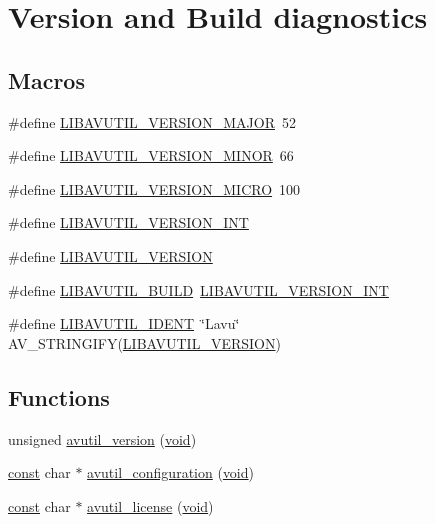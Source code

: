 \hypertarget{group__lavu__ver}{}\section{Version and Build diagnostics}
\label{group__lavu__ver}
\subsection*{Macros}
\begin{DoxyCompactItemize}
\item 
\#define \hyperlink{group__lavu__ver_gaa29a3ad3376b8050d9ef4779045f745e}{L\+I\+B\+A\+V\+U\+T\+I\+L\+\_\+\+V\+E\+R\+S\+I\+O\+N\+\_\+\+M\+A\+J\+OR}~52
\item 
\#define \hyperlink{group__lavu__ver_ga9848c90e4ea707cb0732db0de569452a}{L\+I\+B\+A\+V\+U\+T\+I\+L\+\_\+\+V\+E\+R\+S\+I\+O\+N\+\_\+\+M\+I\+N\+OR}~66
\item 
\#define \hyperlink{group__lavu__ver_gad5484c7f1208de134ba538874d2c04fd}{L\+I\+B\+A\+V\+U\+T\+I\+L\+\_\+\+V\+E\+R\+S\+I\+O\+N\+\_\+\+M\+I\+C\+RO}~100
\item 
\#define \hyperlink{group__lavu__ver_ga36e17e3fc9bcbe5c55820a8ac8b47e3c}{L\+I\+B\+A\+V\+U\+T\+I\+L\+\_\+\+V\+E\+R\+S\+I\+O\+N\+\_\+\+I\+NT}
\item 
\#define \hyperlink{group__lavu__ver_gaee2664f9bb9d1285534db2a40f6fa8af}{L\+I\+B\+A\+V\+U\+T\+I\+L\+\_\+\+V\+E\+R\+S\+I\+ON}
\item 
\#define \hyperlink{group__lavu__ver_ga960fb7dfd268c4c6e7b0c005f81350a9}{L\+I\+B\+A\+V\+U\+T\+I\+L\+\_\+\+B\+U\+I\+LD}~\hyperlink{group__lavu__ver_ga36e17e3fc9bcbe5c55820a8ac8b47e3c}{L\+I\+B\+A\+V\+U\+T\+I\+L\+\_\+\+V\+E\+R\+S\+I\+O\+N\+\_\+\+I\+NT}
\item 
\#define \hyperlink{group__lavu__ver_gacaac95c8d6dca9f3efeba6b5ae02ac02}{L\+I\+B\+A\+V\+U\+T\+I\+L\+\_\+\+I\+D\+E\+NT}~\char`\"{}Lavu\char`\"{} A\+V\+\_\+\+S\+T\+R\+I\+N\+G\+I\+FY(\hyperlink{group__lavu__ver_gaee2664f9bb9d1285534db2a40f6fa8af}{L\+I\+B\+A\+V\+U\+T\+I\+L\+\_\+\+V\+E\+R\+S\+I\+ON})
\end{DoxyCompactItemize}
\subsection*{Functions}
\begin{DoxyCompactItemize}
\item 
unsigned \hyperlink{group__lavu__ver_ga9a979c78d33d8767b51952f7f5c61541}{avutil\+\_\+version} (\hyperlink{sound_8c_ae35f5844602719cf66324f4de2a658b3}{void})
\item 
\hyperlink{getopt1_8c_a2c212835823e3c54a8ab6d95c652660e}{const} char $\ast$ \hyperlink{group__lavu__ver_gaf75e78eac0a55a8c3736f89b018a5687}{avutil\+\_\+configuration} (\hyperlink{sound_8c_ae35f5844602719cf66324f4de2a658b3}{void})
\item 
\hyperlink{getopt1_8c_a2c212835823e3c54a8ab6d95c652660e}{const} char $\ast$ \hyperlink{group__lavu__ver_ga88957e92f27b9d3fca0ec8cf43303b72}{avutil\+\_\+license} (\hyperlink{sound_8c_ae35f5844602719cf66324f4de2a658b3}{void})
\end{DoxyCompactItemize}


